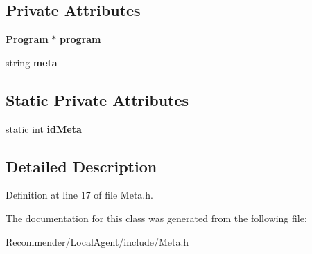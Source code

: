 \subsection*{Private Attributes}
\begin{CompactItemize}
\item 
{\bf Program} $\ast$ {\bf program}\label{classbr_1_1ufscar_1_1lince_1_1ginga_1_1recommender_1_1Meta_f9eacafabab46d63fbfe00ed61d7cd3d}

\item 
string {\bf meta}\label{classbr_1_1ufscar_1_1lince_1_1ginga_1_1recommender_1_1Meta_b306507b740458bf91985012725d7b86}

\end{CompactItemize}
\subsection*{Static Private Attributes}
\begin{CompactItemize}
\item 
static int {\bf idMeta}\label{classbr_1_1ufscar_1_1lince_1_1ginga_1_1recommender_1_1Meta_633ca02e61858df171d9c49ec09b6cb1}

\end{CompactItemize}


\subsection{Detailed Description}




Definition at line 17 of file Meta.h.

The documentation for this class was generated from the following file:\begin{CompactItemize}
\item 
Recommender/LocalAgent/include/Meta.h\end{CompactItemize}
